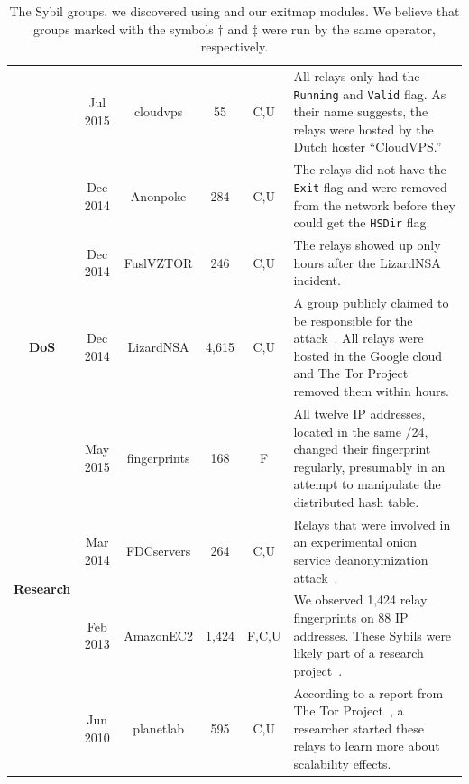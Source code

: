 \begin{table}[ht!]
\begin{tabularx}{\textwidth}{c|c c c c X}
& Jul 2015 & cloudvps & 55 & C,U & All relays only had the \texttt{Running} and
\texttt{Valid} flag.  As their name suggests, the relays were hosted by the
Dutch hoster ``CloudVPS.'' \\

& Dec 2014 & Anonpoke & 284 & C,U & The relays did not have the \texttt{Exit} flag
and were removed from the network before they could get the \texttt{HSDir} flag.
\\

& Dec 2014 & FuslVZTOR & 246 & C,U & The relays showed up only hours after the
LizardNSA incident. \\

\hline

\multirow{1}{*}{\textbf{DoS}}
& Dec 2014 & LizardNSA & 4,615 & C,U & A group publicly claimed to be
responsible for the attack~\cite{lizards}.  All relays were hosted in the Google
cloud and The Tor Project removed them within hours. \\

\hline

\multirow{4}{*}{\textbf{Research}}
& May 2015 & fingerprints & 168 & F & All twelve IP addresses, located in the
same /24, changed their fingerprint regularly, presumably in an attempt to
manipulate the distributed hash table. \\

& Mar 2014 & FDCservers & 264 & C,U & Relays that were involved in an
experimental onion service deanonymization attack~\cite{cmucert}. \\

& Feb 2013 & AmazonEC2 & 1,424 & F,C,U & We observed 1,424 relay fingerprints on
88 IP addresses.  These Sybils were likely part of a research
project~\cite{Biryukov2013a}. \\

& Jun 2010 & planetlab & 595 & C,U & According to a report from The Tor
Project~\cite{progressreport}, a researcher started these relays to learn more
about scalability effects. \\

\hline

\end{tabularx}
\caption{The Sybil groups, we discovered using \sys and our exitmap
modules.  We believe that groups marked with the
symbols $\dagger$ and $\ddagger$ were run by the same operator, respectively.}
\label{tab:sybils}
\end{table}

